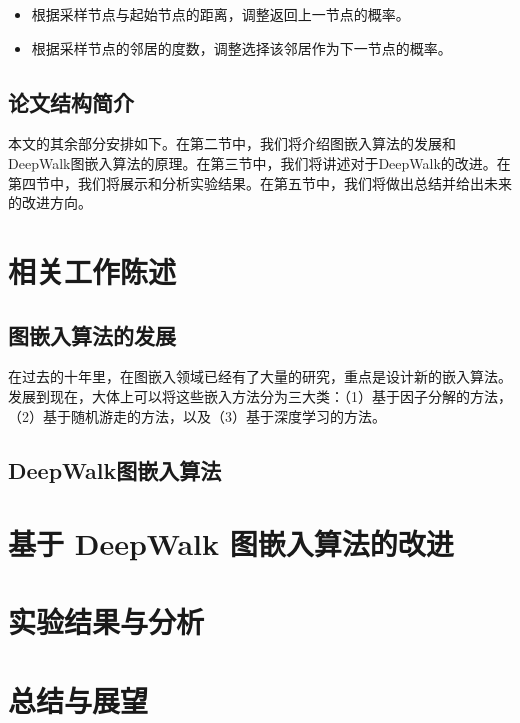 \documentclass{ctexart}
\begin{document}
\begin{itemize}
    \item 根据采样节点与起始节点的距离，调整返回上一节点的概率。
    \item 根据采样节点的邻居的度数，调整选择该邻居作为下一节点的概率。
\end{itemize}

\subsection{论文结构简介}
本文的其余部分安排如下。在第二节中，我们将介绍图嵌入算法的发展和DeepWalk图嵌入算法的原理。在第三节中，我们将讲述对于DeepWalk的改进。在第四节中，我们将展示和分析实验结果。在第五节中，我们将做出总结并给出未来的改进方向。

\section{相关工作陈述}

\subsection{图嵌入算法的发展}

在过去的十年里，在图嵌入领域已经有了大量的研究，重点是设计新的嵌入算法。发展到现在，大体上可以将这些嵌入方法分为三大类：（1）基于因子分解的方法，（2）基于随机游走的方法，以及（3）基于深度学习的方法\cite{goyal2018graph}。



\subsection{DeepWalk图嵌入算法}


\section{基于 DeepWalk 图嵌入算法的改进}


\section{实验结果与分析}

\section{总结与展望}




\end{document}
